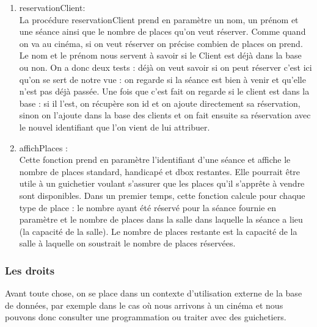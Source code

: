 \documentclass[a4paper,sffamily,12pt]{article}
\begin{document}
					\begin{enumerate}[label=\ding{228}]

						\item reservationClient: \\
						
							La procédure reservationClient prend en paramètre un nom, un prénom et une séance ainsi que le nombre de places qu'on veut réserver. Comme quand on va au cinéma, si on veut réserver on précise combien de places on prend. Le nom et le prénom nous servent à savoir si le Client est déjà dans la base ou non. On a donc deux tests : déjà on veut savoir si on peut réserver c'est ici qu'on se sert de notre vue : on regarde si la séance est bien à venir et qu'elle n'est pas déjà passée. Une fois que c'est fait on regarde si le client est dans la base : si il l'est, on récupère son id et on ajoute directement sa réservation, sinon on l'ajoute dans la base des clients et on fait ensuite sa réservation avec le nouvel identifiant que l'on vient de lui attribuer.\\
												
						\item affichPlaces : \\
						
							Cette fonction prend en paramètre l'identifiant d'une séance et affiche le nombre de places standard, handicapé et dbox restantes. Elle pourrait être utile à un guichetier voulant s'assurer que les places qu'il s'apprête à vendre sont disponibles. Dans un premier temps, cette fonction calcule pour chaque type de place : le nombre ayant été réservé pour la séance fournie en paramètre et le nombre de places dans la salle dans laquelle la séance a lieu (la capacité de la salle). Le nombre de places restante est la capacité de la salle à laquelle on soustrait le nombre de places réservées.\\
																	
					\end{enumerate}

				\subsubsection{Les droits}
				
					\vspace{0.5cm}
					
					Avant toute chose, on se place dans un contexte d'utilisation externe de la base de données, par exemple dans le cas où nous arrivons à un cinéma et nous pouvons donc consulter une programmation ou traiter avec des guichetiers. \\ 
\end{document}
